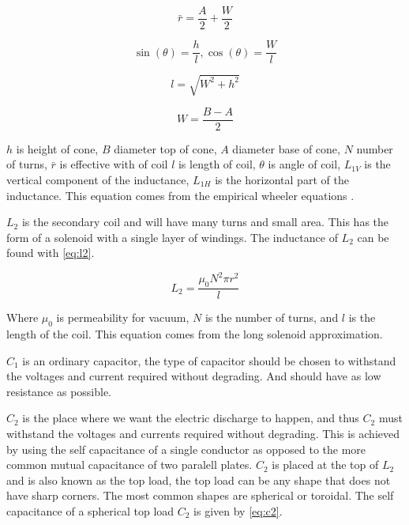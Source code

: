 \begin{equation} \label{eq:l1_3}
    \bar{r} = \frac{A}{2} + \frac{W}{2}
\end{equation}

\begin{equation} \label{eq:l1_4}
    \sin (\theta) = \frac{h}{l}, \cos (\theta) = \frac{W}{l}
\end{equation}

\begin{equation} \label{eq:l1_5}
    l = \sqrt{W^2 + h^2}
\end{equation}

\begin{equation} \label{eq:l1_6}
    W = \frac{B - A}{2}
\end{equation}


$h$ is height of cone, $B$ diameter top of cone, $A$ diameter base of cone, $N$ number of turns, $\bar{r}$ is effective with of coil $l$ is length of coil, $\theta$ is angle of coil, $L_{1V}$ is the vertical component of the inductance, $L_{1H}$ is the horizontal part of the inductance. This equation comes from the empirical wheeler equations \citep{wheeler}.

$L_2$ is the secondary coil and will have many turns and small area. This has the form of a solenoid with a single layer of windings. The inductance of $L_2$ can be found with \cref{eq:l2}.

\begin{equation} \label{eq:l2}
    L_2 = \frac{{\mu}_0 N^2 \pi {r}^2}{l}
\end{equation}

Where ${\mu}_0$ is permeability for vacuum, $N$ is the number of turns, and $l$ is the length of the coil. This equation comes from the long solenoid approximation.

$C_1$ is an ordinary capacitor, the type of capacitor should be chosen to withstand the voltages and current required without degrading. And should have as low resistance as possible.

$C_2$ is the place where we want the electric discharge to happen, and thus $C_2$ must withstand the voltages and currents required without degrading. This is achieved by using the self capacitance of a single conductor as opposed to the more common mutual capacitance of two paralell plates. $C_2$ is placed at the top of $L_2$ and is also known as the top load, the top load can be any shape that does not have sharp corners. The most common shapes are spherical or toroidal. The self capacitance of a spherical top load $C_2$ is given by \cref{eq:c2}.

